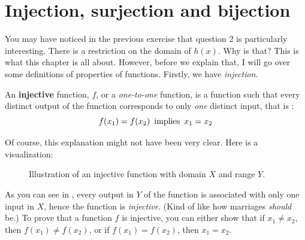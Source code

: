 
\section{Injection, surjection and bijection}
You may have noticed in the previous exercise that question 2 is particularly interesting. There is a restriction on the domain of \(h(x)\). Why is that? This is what this chapter is all about. However, before we explain that, I will go over some definitions of properties of functions. Firstly, we have \emph{injection}. 
\begin{definition}
  An \textbf{injective} function, \(f\), or a \textit{one-to-one} function, is a function such that every distinct output of the function corresponds to only \textit{one} distinct input, that is \footnotemark:  
  \begin{equation*}
    f(x_1) = f(x_2) \text{\, implies \,} x_1 = x_2 
  \end{equation*}
\end{definition}
Of course, this explanation might not have been very clear. Here is a visualization:
\begin{figure}[h]
  \centering

  \caption{Illustration of an injective function with domain \(X\) and range \(Y\).}
  \label{inj}
\end{figure}


As you can see in , every output in \(Y\) of the function is associated with only one input in \(X\), hence the function is \textit{injective}. (Kind of like how marriages \textit{should} be.) To prove that a function \(f\) is injective, you can either show that if \(x_1 \neq x_2\), then \(f(x_1) \neq f(x_2)\), or if \(f(x_1) = f(x_2)\), then \(x_1 = x_2\).


